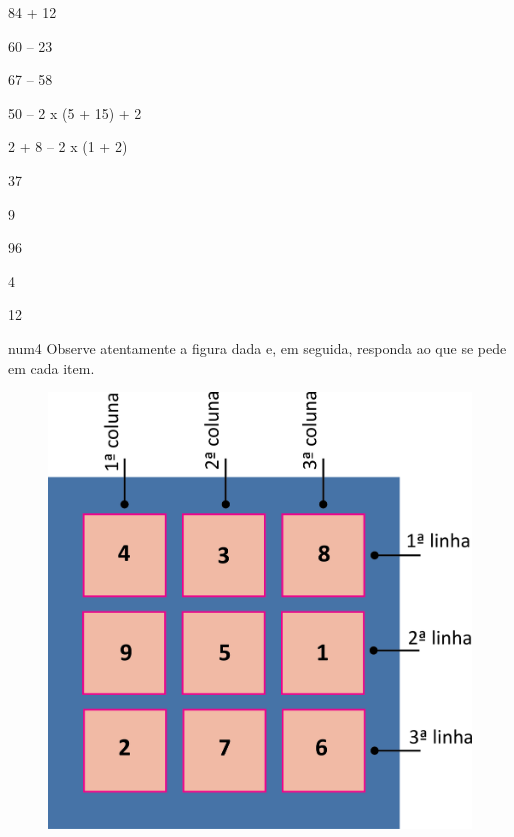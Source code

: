 \begin{multicols}{2}
84 + 12

60 -- 23

67 -- 58

50 -- 2 x (5 + 15) + 2

2 + 8 -- 2 x (1 + 2)

37

9

96

4

12
\end{multicols}

num{4} Observe atentamente a figura dada e, em seguida, responda ao que se pede em cada item.


\begin{figure}[htpb!]
\centering
\includegraphics[width=.5\textwidth]{./media/image14.png}
\end{figure}

